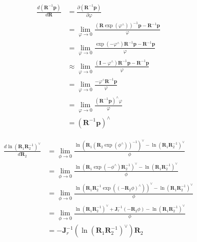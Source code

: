 \documentclass[12pt,a4paper]{article}
\begin{document}
\begin{equation}
\begin{aligned}
\frac{d(\mathbf{R}^{-1} \mathbf{p})}{d \mathbf{R}} 
&= \frac{\partial{(\mathbf{R}^{-1} \mathbf{p})}}{\partial{\varphi}} \\
&= \lim_{\varphi \rightarrow 0} 
   \frac{(\mathbf{R}\exp(\varphi^{\wedge}))^{-1} \mathbf{p} - \mathbf{R}^{-1} \mathbf{p}} {\varphi} \\
&= \lim_{\varphi \rightarrow 0} 
   \frac{\exp(-\varphi^{\wedge}) \mathbf{R}^{-1} \mathbf{p} - \mathbf{R}^{-1} \mathbf{p}} {\varphi} \\
&\approx 
   \lim_{\varphi \rightarrow 0} 
   \frac{(\mathbf{I}-\varphi^{\wedge}) \mathbf{R}^{-1} \mathbf{p} - \mathbf{R}^{-1} \mathbf{p}} {\varphi} \\
&= \lim_{\varphi \rightarrow 0} 
   \frac{-\varphi^{\wedge} \mathbf{R}^{-1} \mathbf{p}} {\varphi} \\
&= \lim_{\varphi \rightarrow 0} 
   \frac{(\mathbf{R}^{-1}\mathbf{p})^{\wedge} \varphi} {\varphi} \\
&= (\mathbf{R}^{-1}\mathbf{p})^{\wedge}
\end{aligned}
\end{equation}


\begin{equation}
\begin{aligned}
\frac{d \ln(\mathbf{R}_1 \mathbf{R}_2^{-1})^{\vee}}{d \mathbf{R}_2}
&= \lim_{\phi \rightarrow 0} 
   \frac{\ln(\mathbf{R}_1 (\mathbf{R}_2 \exp(\phi^{\wedge}))^{-1})^{\vee} - \ln(\mathbf{R}_1 \mathbf{R}_2^{-1})^{\vee}} {\phi} \\
&= \lim_{\phi \rightarrow 0} 
   \frac{\ln(\mathbf{R}_1 \exp(-\phi^{\wedge}) \mathbf{R}_2^{-1})^{\vee}  - \ln(\mathbf{R}_1 \mathbf{R}_2^{-1})^{\vee}} {\phi} \\
&= \lim_{\phi \rightarrow 0} 
   \frac{\ln(\mathbf{R}_1 \mathbf{R}_2^{-1} \exp((-\mathbf{R}_2 \phi)^{\wedge}))^{\vee} - \ln(\mathbf{R}_1\mathbf{R}_2^{-1})^{\vee}} {\phi} \\
&= \lim_{\phi \rightarrow 0} 
   \frac{\ln(\mathbf{R}_1\mathbf{R}_2^{-1})^{\vee} + \mathbf{J}_r^{-1} (-\mathbf{R}_2 \phi) - \ln(\mathbf{R}_1\mathbf{R}_2^{-1})^{\vee}} {\phi} \\
&= -\mathbf{J}_r^{-1}(\ln(\mathbf{R}_1\mathbf{R}_2^{-1})^{\vee}) \mathbf{R}_2
\end{aligned}
\end{equation}




\end{document}
